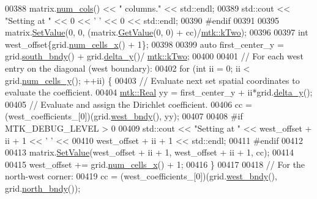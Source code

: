 \begin{DoxyCode}
00388       matrix.\hyperlink{classmtk_1_1DenseMatrix_a41747502d468c6728a4be31501b16e0e}{num\_cols}() << \textcolor{stringliteral}{" columns."} << std::endl;
00389     std::cout << \textcolor{stringliteral}{"Setting at "} << 0 << \textcolor{charliteral}{' '} << 0 << std::endl;
00390 \textcolor{preprocessor}{    #endif}
00391 
00395     matrix.\hyperlink{classmtk_1_1DenseMatrix_a784ce5784109ac86bfb9d8562b334b13}{SetValue}(0, 0, (matrix.\hyperlink{classmtk_1_1DenseMatrix_a4b23ecbebd970b5eea915dbb50691024}{GetValue}(0, 0) + cc)/\hyperlink{group__c01-roots_gaf39c2d851a2db744f4feb1c5ab3ec2cf}{mtk::kTwo});
00396 
00397     \textcolor{keywordtype}{int} west\_offset\{grid.\hyperlink{classmtk_1_1UniStgGrid2D_a2d182866a398aba8e4829590e85bf939}{num\_cells\_x}() + 1\};
00398 
00399     \textcolor{keyword}{auto} first\_center\_y = grid.\hyperlink{classmtk_1_1UniStgGrid2D_a1442eaf219f099d0ebf46a170fdebf92}{south\_bndy}() + grid.\hyperlink{classmtk_1_1UniStgGrid2D_a65a78cfc80ffdbeb282ed57af4dc5cb4}{delta\_y}()/
      \hyperlink{group__c01-roots_gaf39c2d851a2db744f4feb1c5ab3ec2cf}{mtk::kTwo};
00400 
00401     \textcolor{comment}{// For each west entry on the diagonal (west boundary):}
00402     \textcolor{keywordflow}{for} (\textcolor{keywordtype}{int} ii = 0; ii < grid.\hyperlink{classmtk_1_1UniStgGrid2D_aed05a801cc9a76dba0ff203cea58a61a}{num\_cells\_y}(); ++ii) \{
00403       \textcolor{comment}{// Evaluate next set spatial coordinates to evaluate the coefficient.}
00404       \hyperlink{group__c01-roots_gac080bbbf5cbb5502c9f00405f894857d}{mtk::Real} yy = first\_center\_y + ii*grid.\hyperlink{classmtk_1_1UniStgGrid2D_a65a78cfc80ffdbeb282ed57af4dc5cb4}{delta\_y}();
00405       \textcolor{comment}{// Evaluate and assign the Dirichlet coefficient.}
00406       cc = (west\_coefficients\_[0])(grid.\hyperlink{classmtk_1_1UniStgGrid2D_af2b1712387ded85edaf2b64617d3fc13}{west\_bndy}(), yy);
00407 
00408 \textcolor{preprocessor}{      #if MTK\_DEBUG\_LEVEL > 0}
00409       std::cout << \textcolor{stringliteral}{"Setting at "} << west\_offset + ii + 1 << \textcolor{charliteral}{' '} <<
00410         west\_offset + ii + 1 << std::endl;
00411 \textcolor{preprocessor}{      #endif}
00412 
00413       matrix.\hyperlink{classmtk_1_1DenseMatrix_a784ce5784109ac86bfb9d8562b334b13}{SetValue}(west\_offset + ii + 1, west\_offset + ii + 1, cc);
00414 
00415       west\_offset += grid.\hyperlink{classmtk_1_1UniStgGrid2D_a2d182866a398aba8e4829590e85bf939}{num\_cells\_x}() + 1;
00416     \}
00417 
00418     \textcolor{comment}{// For the north-west corner:}
00419     cc = (west\_coefficients\_[0])(grid.\hyperlink{classmtk_1_1UniStgGrid2D_af2b1712387ded85edaf2b64617d3fc13}{west\_bndy}(), grid.\hyperlink{classmtk_1_1UniStgGrid2D_afe1ead253cdeb5503e0489eba8fd84e2}{north\_bndy}());

\end{DoxyCode}
